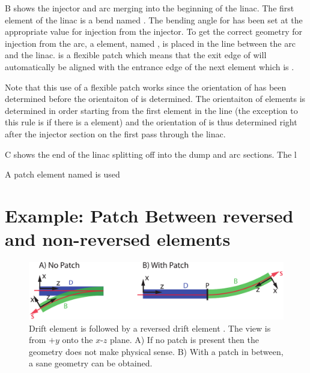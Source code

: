 B shows the injector and arc merging into the beginning of
the linac. The first element of the linac is a bend named
. The bending angle for  has been set at the
appropriate value for injection from the injector. To get the correct
geometry for injection from the arc, a  element, named
, is placed in the  line between the arc and the
linac.  is a flexible patch which means that the exit edge
of  will automatically be aligned with the entrance edge
of the next element which is . 

Note that this use of a flexible patch works since the orientation of
 has been determined before the orientaiton of
 is determined. The orientaiton of elements is determined
in order starting from the first element in the line (the exception to
this rule is if there is a  element) and the
orientation of  is thus determined right after the
injector section on the first pass through the linac.



C shows the end of the linac splitting off into the dump
and arc sections. The l

A patch
element named  is used

\section{Example: Patch Between reversed and non-reversed elements}
\label{s:ex.patch}

\begin{figure}[tb]
  \centering
  \includegraphics[width=5in]{patch-between.pdf}
  \caption[Patching between reversed and non-reversed elements.]{
Drift element  is followed by a reversed drift element .
The view is from $+y$ onto the $x$-$z$ plane. A) If no patch is
present then the geometry does not make physical sense. B) With a
patch in between, a sane geometry can be obtained.}
  \label{f:patch.between}
\end{figure}

